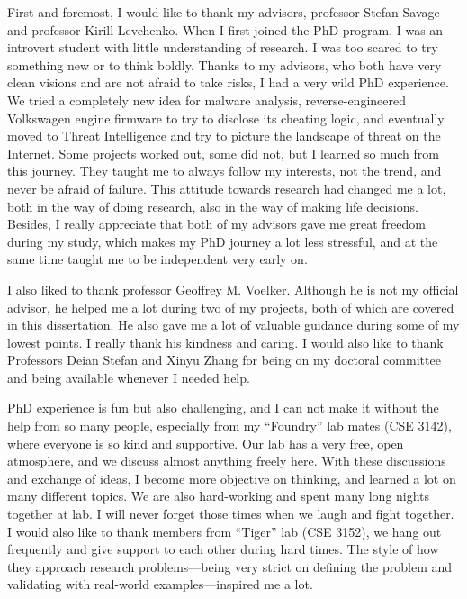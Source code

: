 \begin{acknowledgements}
First and foremost, I would like to thank my advisors, professor Stefan
Savage and professor Kirill Levchenko. When I first joined the PhD program,
I was an introvert student with little understanding of research. I was
too scared to try something new or to think boldly. Thanks to my advisors,
who both have very clean visions and are not afraid to take risks, I had a 
very wild PhD experience. We tried a completely new idea for malware 
analysis, reverse-engineered Volkswagen engine firmware to try to disclose 
its cheating logic, and eventually moved to Threat Intelligence and try to 
picture the landscape of threat on the Internet. Some projects worked out, 
some did not, but I learned so much from this journey. They taught me
to always follow my interests, not the trend, and never be afraid of 
failure. This attitude towards research had changed me a lot, both in the
way of doing research, also in the way of making life decisions. Besides, 
I really appreciate that both of my advisors gave me great freedom during
my study, which makes my PhD journey a lot less stressful, and at the same 
time taught me to be independent very early on.

I also liked to thank professor Geoffrey M. Voelker. Although he is not my
official advisor, he helped me a lot during two of my projects, both of 
which are covered in this dissertation. He also gave me a lot of valuable 
guidance during some of my lowest points. I really thank his kindness
and caring. I would also like to thank Professors Deian Stefan and Xinyu Zhang 
for being on my doctoral committee and being available whenever I needed help.

PhD experience is fun but also challenging, and I can not make it 
without the help from so many people, especially from my ``Foundry'' lab
mates (CSE 3142), where everyone is so kind and supportive.
Our lab has a very free, open atmosphere, and we discuss almost anything
freely here. With these discussions and exchange of ideas, I become 
more objective on thinking, and learned a lot on many different 
topics. We are also hard-working and spent many long nights together
at lab. I will never forget those times when we laugh and fight together. 
I would also like to thank members from ``Tiger'' lab (CSE 3152), we 
hang out frequently and give support to each other during hard times. The style 
of how they approach research problems---being very strict on defining the
problem and validating with real-world examples---inspired me a lot.


\end{acknowledgements}
